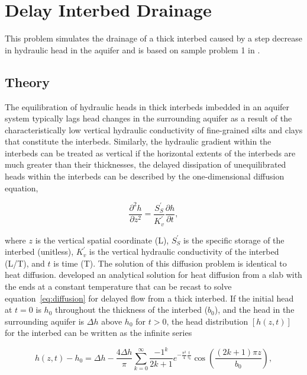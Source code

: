 \section{Delay Interbed Drainage}
This problem simulates the drainage of a thick interbed caused by a step decrease in hydraulic head in the aquifer and is based on sample problem 1 in \cite{hoffmann2003modflow}. 


\subsection{Theory}

The equilibration of hydraulic heads in thick interbeds imbedded in an aquifer system typically lags head changes in the surrounding aquifer as a result of the characteristically low vertical hydraulic conductivity of fine-grained silts and clays that constitute the interbeds. Similarly, the hydraulic gradient within the interbeds can be treated as vertical if the horizontal extents of the interbeds are much greater than their thicknesses, the delayed dissipation of unequilibrated heads within the interbeds can be described by the one-dimensional diffusion equation,

\begin{equation}
	\frac{\partial ^2 h}{\partial z^2} = \frac{S^{\prime}_{S}}{K^{\prime}_{v}} \frac{\partial h}{\partial t},
	\label{eq:diffusion}
\end{equation}

\noindent where $z$ is the vertical spatial coordinate (L), $S^{\prime}_{S}$ is the specific storage of the interbed (unitless), $K^{\prime}_{v}$ is the vertical hydraulic conductivity of the interbed (L/T), and $t$ is time (T). The solution of this diffusion problem is identical to heat diffusion. \cite{carslaw1959conduction} developed an analytical solution for heat diffusion from a slab with the ends at a constant temperature that can be recast to solve equation~\ref{eq:diffusion} for delayed flow from a thick interbed. If the initial head at $t = 0$ is $h_0$ throughout the thickness of the interbed ($b_0$), and the head in the surrounding aquifer is $\Delta h$ above $h_0$ for $t > 0$, the head distribution $[h(z, t)]$ for the interbed can be written as the infinite series

\begin{equation}
	h(z, t) - h_0 = \Delta h - \frac{4 \Delta h}{\pi} \sum^{\infty}_{k = 0} \frac{-1^k}{2k + 1} e^{-\frac{\pi^2}{4} \frac{t}{\tau_k}} \cos \left( \frac{(2k + 1) \pi z}{b_0} \right),
	\label{eq:headdist}
\end{equation}

